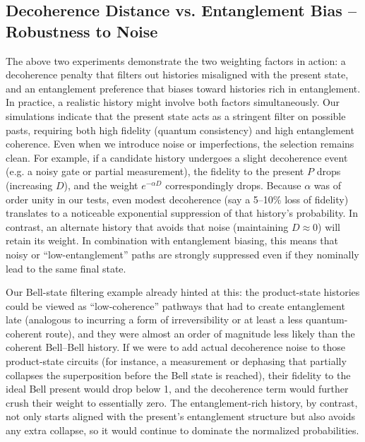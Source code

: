 \documentclass[11pt]{article}
\begin{document}
\subsection*{Decoherence Distance vs. Entanglement Bias – Robustness to Noise} %

The above two experiments demonstrate the two weighting factors in action: a decoherence penalty that filters out histories misaligned with the present state, and an entanglement preference that biases toward histories rich in entanglement. In practice, a realistic history might involve both factors simultaneously. Our simulations indicate that the present state acts as a stringent filter on possible pasts, requiring both high fidelity (quantum consistency) and high entanglement coherence. Even when we introduce noise or imperfections, the selection remains clean. For example, if a candidate history undergoes a slight decoherence event (e.g. a noisy gate or partial measurement), the fidelity to the present $P$ drops (increasing $D$), and the weight $e^{-\alpha D}$ correspondingly drops. Because $\alpha$ was of order unity in our tests, even modest decoherence (say a 5–10\% loss of fidelity) translates to a noticeable exponential suppression of that history’s probability. In contrast, an alternate history that avoids that noise (maintaining $D\approx 0$) will retain its weight. In combination with entanglement biasing, this means that noisy or “low-entanglement” paths are strongly suppressed even if they nominally lead to the same final state.

Our Bell-state filtering example already hinted at this: the product-state histories could be viewed as “low-coherence” pathways that had to create entanglement late (analogous to incurring a form of irreversibility or at least a less quantum-coherent route), and they were almost an order of magnitude less likely than the coherent Bell–Bell history. If we were to add actual decoherence noise to those product-state circuits (for instance, a measurement or dephasing that partially collapses the superposition before the Bell state is reached), their fidelity to the ideal Bell present would drop below 1, and the decoherence term would further crush their weight to essentially zero. The entanglement-rich history, by contrast, not only starts aligned with the present’s entanglement structure but also avoids any extra collapse, so it would continue to dominate the normalized probabilities.
\end{document}
